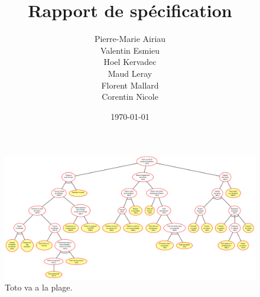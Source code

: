 \documentclass[a4paper]{article}
\title{Rapport de spécification}
\author
{
	Pierre-Marie {\sc Airiau}\\
    Valentin {\sc Esmieu}\\
    Hoel {\sc Kervadec}\\
    Maud {\sc Leray}\\
    Florent {\sc Mallard}\\
    Corentin {\sc Nicole}
}
\date{\today}
\newcommand{\pagevierge}[0]{\newpage\thispagestyle{empty}\null\newpage}
\begin{document}
    \hypersetup{pageanchor=false}
    
    \hypersetup{pageanchor=true}
    
    \newpage
    \thispagestyle{empty}
    \mbox{}
    
    \newpage
    \tableofcontents
    \setlength{\parskip}{10pt}
    
    \newpage
    \thispagestyle{empty}
    \mbox{}

    \newpage
    

    

    

    

    

    


    \begin{landscape}
        \begin{figure}
            \includegraphics[height=0.82\textwidth]{figure/pre_optimiseur.pdf}
            \caption{Toto va a la plage.}
            \label{fig:pre_optimiseur}
        \end{figure}
    \end{landscape}

    
    

    \pagevierge
    \ifthenelse{\isodd{\thepage}}
    {\pagevierge}
    {}
    
\end{document}
